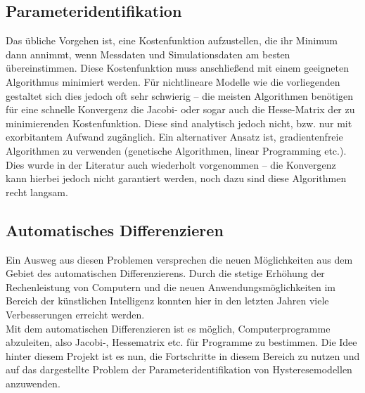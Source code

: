 \documentclass{scrartcl}
\begin{document}
\subsection{Parameteridentifikation}
Das übliche Vorgehen ist, eine Kostenfunktion aufzustellen, die ihr Minimum dann annimmt, wenn Messdaten und Simulationsdaten am besten übereinstimmen. Diese Kostenfunktion muss anschließend mit einem geeigneten Algorithmus minimiert werden. Für nichtlineare Modelle wie die vorliegenden gestaltet sich dies jedoch oft sehr schwierig -- die meisten Algorithmen benötigen für eine schnelle Konvergenz die Jacobi- oder sogar auch die Hesse-Matrix der zu minimierenden Kostenfunktion. Diese sind analytisch jedoch nicht, bzw. nur mit exorbitantem Aufwand zugänglich. Ein alternativer Ansatz ist, gradientenfreie Algorithmen zu verwenden (genetische Algorithmen, linear Programming etc.). Dies wurde in der Literatur auch wiederholt vorgenommen -- die Konvergenz kann hierbei jedoch nicht garantiert werden, noch dazu sind diese Algorithmen recht langsam.
\subsection{Automatisches Differenzieren}
Ein Ausweg aus diesen Problemen versprechen die neuen Möglichkeiten aus dem Gebiet des automatischen Differenzierens. Durch die stetige Erhöhung der Rechenleistung von Computern und die neuen Anwendungsmöglichkeiten im Bereich der künstlichen Intelligenz konnten hier in den letzten Jahren viele Verbesserungen erreicht werden.\\
Mit dem automatischen Differenzieren ist es möglich, Computerprogramme abzuleiten, also Jacobi-, Hessematrix etc. für Programme zu bestimmen. Die Idee hinter diesem Projekt ist es nun, die Fortschritte in diesem Bereich zu nutzen und auf das dargestellte Problem der Parameteridentifikation von Hysteresemodellen anzuwenden.
\end{document}
